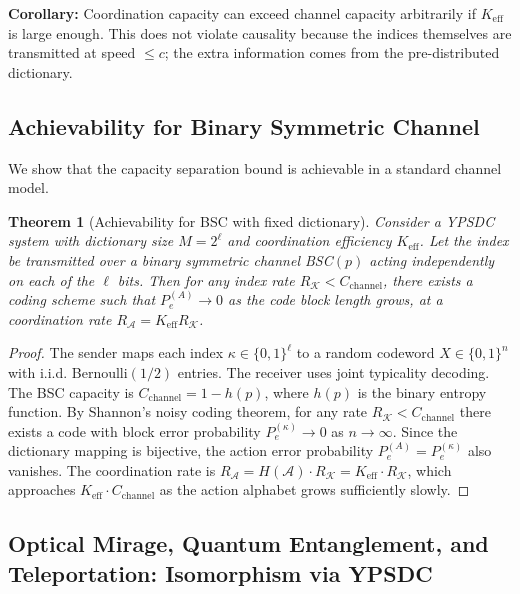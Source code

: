 \documentclass[12pt,a4paper]{article}
\newtheorem{theorem}{Theorem}[section]
\theoremstyle{remark}
\newcommand{\Keff}{K_{\mathrm{eff}}}
\begin{document}
	\noindent
	\textbf{Corollary:} Coordination capacity can exceed channel capacity arbitrarily if $\Keff$ is large enough. This does not violate causality because the indices themselves are transmitted at speed $\le c$; the extra information comes from the pre-distributed dictionary.
	
	\subsection{Achievability for Binary Symmetric Channel}
	\label{subsec:BSC-achievability}
	
	We show that the capacity separation bound is achievable in a standard channel model.
	
	\begin{theorem}[Achievability for BSC with fixed dictionary]
		Consider a YPSDC system with dictionary size \(M = 2^\ell\) and coordination efficiency \(K_{\mathrm{eff}}\). Let the index be transmitted over a binary symmetric channel BSC\((p)\) acting independently on each of the \(\ell\) bits. Then for any index rate \(R_{\mathcal{K}} < C_{\mathrm{channel}}\), there exists a coding scheme such that \(P_e^{(A)} \to 0\) as the code block length grows, at a coordination rate \(R_{\mathcal{A}} = K_{\mathrm{eff}} R_{\mathcal{K}}\).
	\end{theorem}
	
	\begin{proof}
		The sender maps each index \(\kappa \in \{0,1\}^\ell\) to a random codeword \(X \in \{0,1\}^n\) with i.i.d. Bernoulli\((1/2)\) entries. The receiver uses joint typicality decoding. The BSC capacity is \(C_{\mathrm{channel}} = 1 - h(p)\), where \(h(p)\) is the binary entropy function. By Shannon's noisy coding theorem, for any rate \(R_{\mathcal{K}} < C_{\mathrm{channel}}\) there exists a code with block error probability \(P_e^{(\kappa)} \to 0\) as \(n \to \infty\). Since the dictionary mapping is bijective, the action error probability \(P_e^{(A)} = P_e^{(\kappa)}\) also vanishes. The coordination rate is \(R_{\mathcal{A}} = H(\mathcal{A}) \cdot R_{\mathcal{K}} = K_{\mathrm{eff}} \cdot R_{\mathcal{K}}\), which approaches \(K_{\mathrm{eff}} \cdot C_{\mathrm{channel}}\) as the action alphabet grows sufficiently slowly.
	\end{proof}
	
	\subsection{Optical Mirage, Quantum Entanglement, and Teleportation: Isomorphism via YPSDC}
	\label{subsec:mirage-ypsdc}
	
\end{document}
